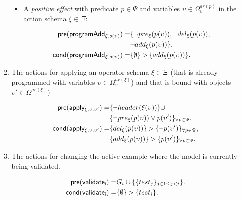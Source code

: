 \documentclass[letterpaper]{article} %
\newcommand{\pre}{\mathsf{pre}}     %
\newcommand{\cond}{\mathsf{cond}}   %
\begin{document}
\begin{itemize}
\begin{enumerate}
\begin{itemize}
\item A {\em positive effect} with predicate $p\in\Psi$ and variables $\upsilon\in\Omega_v^{ar(p)}$ in the action schema $\xi\in\Xi$:
\begin{small}
\begin{align*}
\hspace*{7pt}\pre(\mathsf{programAdd_{\xi,p(\upsilon)}})=&\{\neg pre_{\xi}(p(\upsilon)),\neg del_{\xi}(p(\upsilon)),\\
                                                     &\neg add_{\xi}(p(\upsilon))\}.\\                                                   
\cond(\mathsf{programAdd_{\xi,p(\upsilon)}})=&\{\emptyset\}\rhd\{add_{\xi}(p(\upsilon))\}.
\end{align*}
\end{small}
\end{itemize}

\item The actions for applying an operator schema $\xi\in\Xi$ (that is already programmed with variables $\upsilon\in\Omega_v^{ar(\xi)}$) and that is bound with objects $\upsilon'\in\Omega^{ar(\xi)}$)
\begin{small}
\begin{align*}
\hspace*{7pt}\pre(\mathsf{apply_{\xi,\upsilon,\upsilon'}})=&\{\neg header(\xi(\upsilon))\}\cup\\     
                                           &\{\neg pre_{\xi}(p(\upsilon))\vee p(\upsilon')\}_{\forall p\in\Psi}.\\
\cond(\mathsf{apply_{\xi,\upsilon,\upsilon'}})=&\{del_{\xi}(p(\upsilon))\}\rhd\{\neg p(\upsilon')\}_{\forall p\in\Psi},\\
&\{add_{\xi}(p(\upsilon))\}\rhd\{p(\upsilon')\}_{\forall p\in\Psi}.
\end{align*}
\end{small}

\item The actions for changing the active example where the model is currently being validated.
\begin{small}
\begin{align*}
\hspace*{7pt}\pre(\mathsf{validate_{i}})=&G_i\cup\{\{test_j\}_{j\in 1\leq j<i}\}.\\
\cond(\mathsf{validate_{i}})=&\{\emptyset\}\rhd\{test_i\}.
\end{align*}
\end{small}
\end{enumerate}
\end{itemize}
\end{document}
